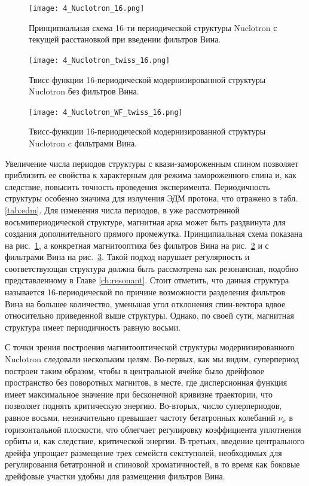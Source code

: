 \begin{figure}[!h]
  \centering
   \texttt{[image: 4\_Nuclotron\_16.png]}
   \caption{Принципиальная схема 16-ти периодической структуры Nuclotron с текущей расстановкой при введении фильтров Вина.}
   \label{fig:4_Nuclotron_16}
\end{figure}

\begin{figure}[!h]
  \centering
   \texttt{[image: 4\_Nuclotron\_twiss\_16.png]}
   \caption{Твисс-функции 16-периодической модернизированной структуры Nuclotron без фильтров Вина.}
   \label{fig:4_Nuclotron_twiss_16}
\end{figure}

\begin{figure}[!h]
  \centering
   \texttt{[image: 4\_Nuclotron\_WF\_twiss\_16.png]}
   \caption{Твисс-функции 16-периодической модернизированной структуры Nuclotron c фильтрами Вина.}
   \label{fig:4_Nuclotron_twiss_16_WF}
\end{figure}

\par Увеличение числа периодов структуры с квази-замороженным спином позволяет приблизить ее свойства к характерным для режима замороженного спина и, как следствие, повысить точность проведения эксперимента. Периодичность структуры особенно значима для излучения ЭДМ протона, что отражено в табл. \ref{tab:edm}. Для изменения числа периодов, в уже рассмотренной восьмипериодической структуре, магнитная арка может быть раздвинута для создания дополнительного прямого промежутка. Принципиальная схема показана на рис.~\ref{fig:4_Nuclotron_16}, а конкретная магнитооптика без фильтров Вина на рис.~\ref{fig:4_Nuclotron_twiss_16} и с фильтрами Вина на рис.~\ref{fig:4_Nuclotron_twiss_16_WF}. Такой подход нарушает регулярность и соответствующая структура должна быть рассмотрена как резонансная, подобно представленному в Главе \ref{ch:resonant}. Стоит отметить, что данная структура называется 16-периодической по причине возможности разделения фильтров Вина на большее количество, уменьшая угол отклонения спин-вектора вдвое относительно приведенной выше структуры. Однако, по своей сути, магнитная структура имеет периодичность равную восьми.

\par С точки зрения построения магнитооптической структуры модернизированного Nuclotron следовали нескольким целям. Во-первых, как мы видим, суперпериод построен таким образом, чтобы в центральной ячейке было дрейфовое пространство без поворотных магнитов, в месте, где дисперсионная функция имеет максимальное значение при бесконечной кривизне траектории, что позволяет поднять критическую энергию. Во-вторых, число суперпериодов, равное восьми, незначительно превышает частоту бетатронных колебаний ${\nu}_x$ в горизонтальной плоскости, что облегчает регулировку коэффициента уплотнения орбиты и, как следствие, критической энергии. В-третьих, введение центрального дрейфа упрощает размещение трех семейств секступолей, необходимых для регулирования бетатронной и спиновой хроматичностей, в то время как боковые дрейфовые участки удобны для размещения фильтров Вина.

